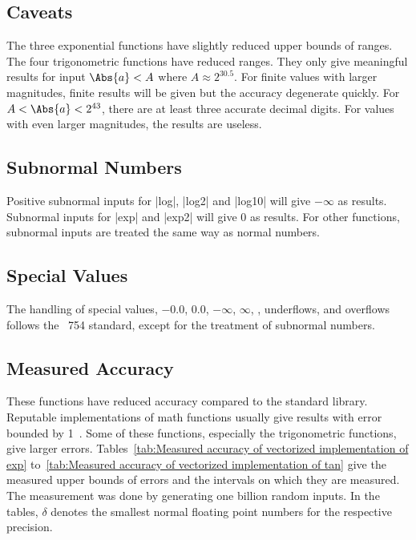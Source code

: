 \subsection{Caveats}
\label{sub:Caveats}

The three exponential functions have slightly reduced upper bounds of ranges.
The four trigonometric functions have reduced ranges. They only give meaningful
results for input $\Abs{a} < A$ where $A \approx 2^{30.5}$. For finite values
with larger magnitudes, finite results will be given but the accuracy
degenerate quickly. For $A < \Abs{a} < 2^{43}$, there are at least three
accurate decimal digits. For values with even larger magnitudes, the results
are useless.

\subsection{Subnormal Numbers}
\label{sub:Subnormal Numbers}

Positive subnormal inputs for |log|, |log2| and |log10| will give $-\infty$ as
results. Subnormal inputs for |exp| and |exp2| will give $0$ as results. For
other functions, subnormal inputs are treated the same way as normal numbers.

\subsection{Special Values}
\label{sub:Special Values}

The handling of special values, $-0.0$, $0.0$, $-\infty$, $\infty$, \nan,
underflows, and overflows follows the \ieee~754 standard, except for the
treatment of subnormal numbers.

\subsection{Measured Accuracy}
\label{sub:Measured Accuracy}

These functions have reduced accuracy compared to the standard library.
Reputable implementations of math functions usually give results with error
bounded by 1~\ulp. Some of these functions, especially the trigonometric
functions, give larger errors. Tables~\ref{tab:Measured accuracy of vectorized
  implementation of exp} to~\ref{tab:Measured accuracy of vectorized
implementation of tan} give the measured upper bounds of errors and the
intervals on which they are measured. The measurement was done by generating
one billion random inputs. In the tables, $\delta$ denotes the smallest normal
floating point numbers for the respective precision.

